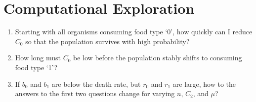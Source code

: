 \documentclass[11pt]{article}
\begin{document}
\section*{Computational Exploration}

	\begin{enumerate}
		
		\item
		Starting with all organisms consuming food type `0', how quickly can I reduce $C_0$ so that the population survives with high probability?
		
		\item
		How long must $C_0$ be low before the population stably shifts to consuming food type `1'?
		
		\item
		If $b_0$ and $b_1$ are below the death rate, but $r_0$ and $r_1$ are large, how to the answers to the first two questions change for varying $n$, $C_2$, and $\mu$?
		
	\end{enumerate}
\end{document}

